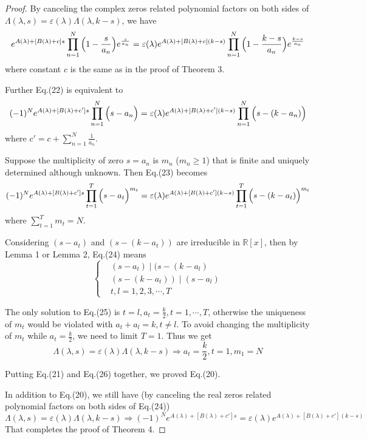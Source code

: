 \documentclass[12pt]{article}
\begin{document}
\begin{proof}
By canceling the complex zeros related polynomial factors on both sides of $\Lambda(\lambda, s)=\varepsilon(\lambda)\Lambda(\lambda, k-s)$, we have
\begin{equation}e^{A(\lambda)+[B(\lambda)+c]s}\prod_{n=1}^{N}\Big{(}1-\frac{s}{a_n}\Big{)}e^{\frac{s}{a_n}}
=\varepsilon(\lambda)e^{A(\lambda)+[B(\lambda)+c](k-s)}\prod_{n=1}^{N}\Big{(}1-\frac{k-s}{a_n}\Big{)}e^{\frac{k-s}{a_n}}
\end{equation}
where constant $c$ is the same as in the proof of Theorem 3.

Further Eq.(22) is equivalent to
\begin{equation}(-1)^Ne^{A(\lambda)+[B(\lambda)+c']s}\prod_{n=1}^{N}\Big{(}s-a_n\Big{)}
=\varepsilon(\lambda)e^{A(\lambda)+[B(\lambda)+c'](k-s)}\prod_{n=1}^{N}\Big{(}s-(k-a_n)\Big{)}
\end{equation}
where $c'=c+\sum_{n=1}^{N} \frac{1}{a_n}$.

Suppose the multiplicity of zero $s=a_n$ is $m_n$ ($m_n\geq 1$) that is finite and uniquely determined although unknown. Then Eq.(23) becomes
 \begin{equation}(-1)^Ne^{A(\lambda)+[B(\lambda)+c']s}\prod_{t=1}^{T}\Big{(}s-a_t\Big{)}^{m_t}
=\varepsilon(\lambda)e^{A(\lambda)+[B(\lambda)+c'](k-s)}\prod_{t=1}^{T}\Big{(}s-(k-a_t)\Big{)}^{m_t}
\end{equation}
where $\sum_{t=1}^{T} m_t = N$.

Considering $(s-a_t)$ and $(s-(k-a_t))$ are irreducible in $\mathbb{R}[x]$, then by Lemma 1 or Lemma 2, Eq.(24) means
\begin{equation}\begin{cases}&(s-a_t)\mid (s-(k-a_l)\\
 &(s-(k-a_t))\mid (s-a_l)\\
 & t, l=1, 2, 3, \cdots, T
 \end{cases}\end{equation}

The only solution to Eq.(25) is $t=l, a_t=\frac{k}{2}, t=1, \cdots, T$, otherwise the uniqueness of $m_t$ would be violated with $a_t+a_l=k, t\neq l$.
 To avoid changing the multiplicity of $m_t$ while $a_t=\frac{k}{2}$, we need to limit $T=1$. Thus we get
\begin{equation} \Lambda(\lambda, s)=\varepsilon(\lambda)\Lambda(\lambda, k-s)\Rightarrow a_t=\frac{k}{2}, t=1, m_1=N
\end{equation}

Putting Eq.(21) and Eq.(26) together, we proved Eq.(20).

In addition to Eq.(20), we still have (by canceling the real zeros related polynomial factors on both sides of Eq.(24))
\begin{equation}\Lambda(\lambda, s)=\varepsilon(\lambda)\Lambda(\lambda, k-s)\Longrightarrow (-1)^Ne^{A(\lambda)+[B(\lambda)+c']s}=\varepsilon(\lambda)e^{A(\lambda)+[B(\lambda)+c'](k-s)}
\end{equation}
That completes the proof of Theorem 4.
\end{proof}
\end{document}
